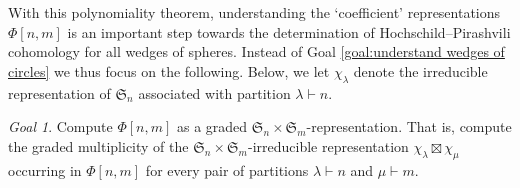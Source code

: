 \documentclass[12pt]{article}
\newcommand{\Q}{\mathbb{Q}}
\newcommand{\SymGroup}[1][n]{\mathfrak{S}_{#1}}
\newcommand{\Specht}[1]{\chi_{#1}}
\theoremstyle{plain}
\theoremstyle{definition}
\theoremstyle{remark}
\newtheorem{goal}[thm]{Goal}
\begin{document}
    
    



With this polynomiality theorem, understanding the `coefficient' representations $\Phi[n,m]$ is an important step towards the determination of Hochschild--Pirashvili cohomology for all wedges of spheres. Instead of Goal \ref{goal:understand wedges of circles} we thus focus on the following. Below, we let $\Specht{\lambda}$ denote the irreducible representation of $\SymGroup$ associated with partition $\lambda\vdash n$.

\begin{goal} \label{goal:decompose coefficients}
Compute $\Phi[n,m]$ as a graded $\SymGroup\times\SymGroup[m]$-representation. That is, compute the graded multiplicity of the $\SymGroup\times\SymGroup[m]$-irreducible representation $\Specht{\lambda} \boxtimes \Specht{\mu}$ occurring in $\Phi[n,m]$ for every pair of partitions $\lambda \vdash n$ and $\mu \vdash m$.
\end{goal}
\end{document}
